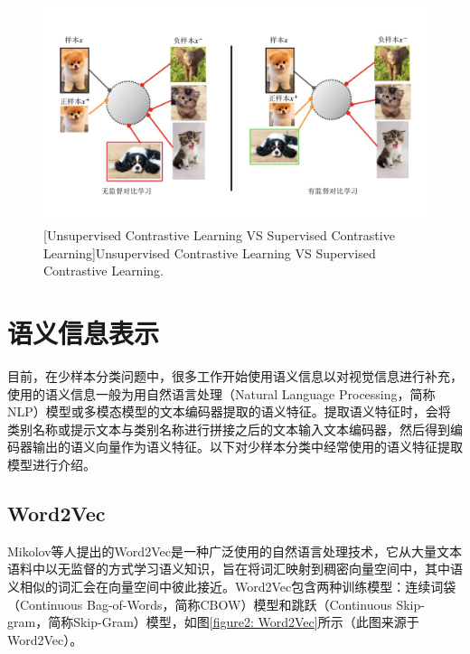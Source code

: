 \begin{figure}[h!]
\centering
{}
\includegraphics[width=1.0\columnwidth]{figures/RelatedWork/对比学习.pdf}
[Unsupervised Contrastive Learning VS Supervised Contrastive Learning]{Unsupervised Contrastive Learning VS Supervised Contrastive Learning.}
\label{figure2: 对比学习}
\end{figure}

\section[\hspace{-2pt}语义信息表示]{{\heiti{} \hspace{-8pt}语义信息表示}}\label{section2: 语义信息表示}

目前，在少样本分类问题中，很多工作开始使用语义信息以对视觉信息进行补充，使用的语义信息一般为用自然语言处理（Natural Language Processing，简称NLP）模型或多模态模型的文本编码器提取的语义特征。提取语义特征时，会将类别名称或提示文本与类别名称进行拼接之后的文本输入文本编码器，然后得到编码器输出的语义向量作为语义特征。以下对少样本分类中经常使用的语义特征提取模型进行介绍。

\subsection[\hspace{-2pt}Word2Vec]{{\heiti{} \hspace{-8pt}Word2Vec}}\label{section2: Word2Vec}

Mikolov等人\cite{mikolov2013efficient, Word2Vec}提出的Word2Vec是一种广泛使用的自然语言处理技术，它从大量文本语料中以无监督的方式学习语义知识，旨在将词汇映射到稠密向量空间中，其中语义相似的词汇会在向量空间中彼此接近。Word2Vec包含两种训练模型：连续词袋（Continuous Bag-of-Words，简称CBOW）模型和跳跃（Continuous Skip-gram，简称Skip-Gram）模型，如图\ref{figure2: Word2Vec}所示（此图来源于Word2Vec\cite{Word2Vec}）。

